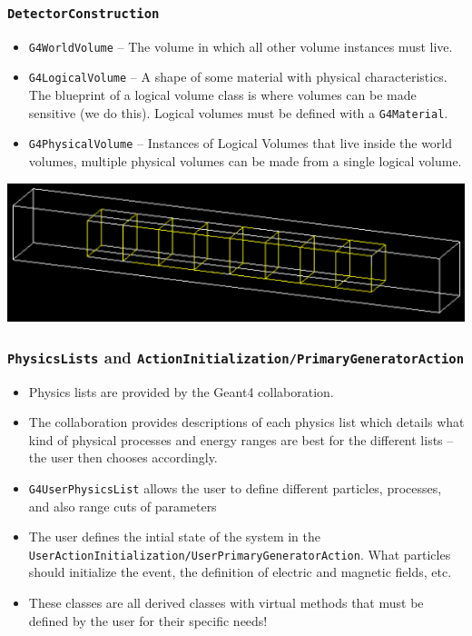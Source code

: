 \documentclass[mathserif,18pt,xcolor=table]{beamer}
\begin{document}
\begin{frame}
  \frametitle{\texttt{DetectorConstruction}}
  \begin{itemize}
  \item \texttt{G4WorldVolume} -- The volume in which all other volume instances must live.
  \item \texttt{G4LogicalVolume} -- A shape of some material with physical characteristics. The blueprint of a logical volume class is where volumes can be made sensitive (we do this). Logical volumes must be defined with a \texttt{G4Material}.
  \item \texttt{G4PhysicalVolume} -- Instances of Logical Volumes that live inside the world volumes, multiple physical volumes can be made from a single logical volume.
  \end{itemize}
\centerline{\includegraphics[width=.7\linewidth]{pics/volumes.png}}
\end{frame}

\begin{frame}
  \frametitle{\texttt{PhysicsLists} and \texttt{ActionInitialization/PrimaryGeneratorAction}}
  {\footnotesize
  \begin{itemize}
  \item Physics lists are provided by the Geant4 collaboration.
  \item The collaboration provides descriptions of each physics list which details what kind of physical processes and energy ranges are best for the different lists -- the user then chooses accordingly.
  \item \texttt{G4UserPhysicsList} allows the user to define different particles, processes, and also range cuts of parameters
  \item The user defines the intial state of the system in the \texttt{UserActionInitialization/UserPrimaryGeneratorAction}. What particles should initialize the event, the definition of electric and magnetic fields, etc.
  \item These classes are all derived classes with virtual methods that must be defined by the user for their specific needs!
  \end{itemize}}
\end{frame}
\end{document}
